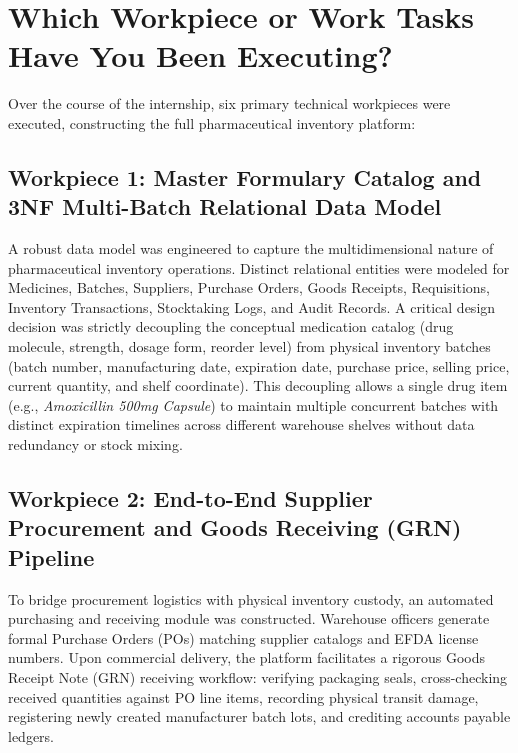 \section{Which Workpiece or Work Tasks Have You Been Executing?}
Over the course of the internship, six primary technical workpieces were executed, constructing the full pharmaceutical inventory platform:

\subsection{Workpiece 1: Master Formulary Catalog and 3NF Multi-Batch Relational Data Model}
A robust data model was engineered to capture the multidimensional nature of pharmaceutical inventory operations. Distinct relational entities were modeled for Medicines, Batches, Suppliers, Purchase Orders, Goods Receipts, Requisitions, Inventory Transactions, Stocktaking Logs, and Audit Records. A critical design decision was strictly decoupling the conceptual medication catalog (drug molecule, strength, dosage form, reorder level) from physical inventory batches (batch number, manufacturing date, expiration date, purchase price, selling price, current quantity, and shelf coordinate). This decoupling allows a single drug item (e.g., \textit{Amoxicillin 500mg Capsule}) to maintain multiple concurrent batches with distinct expiration timelines across different warehouse shelves without data redundancy or stock mixing.

\subsection{Workpiece 2: End-to-End Supplier Procurement and Goods Receiving (GRN) Pipeline}
To bridge procurement logistics with physical inventory custody, an automated purchasing and receiving module was constructed. Warehouse officers generate formal Purchase Orders (POs) matching supplier catalogs and EFDA license numbers. Upon commercial delivery, the platform facilitates a rigorous Goods Receipt Note (GRN) receiving workflow: verifying packaging seals, cross-checking received quantities against PO line items, recording physical transit damage, registering newly created manufacturer batch lots, and crediting accounts payable ledgers.

